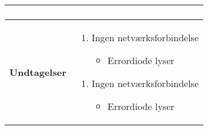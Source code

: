 \begin{center}
\begin{longtable}{|p{5cm}|p{9cm}|}
\begin{enumerate}
			\end{enumerate}
		\\\hline
		\textbf{Undtagelser}
			&\begin{enumerate}[label=\ref{kravspec:uc4_opdaterweb}.a]
			\item Ingen netværksforbindelse
					\begin{itemize}				
						\item Errordiode lyser
					\end{itemize}
			\end{enumerate}
			\begin{enumerate}[label=\ref{kravspec:uc4_emailafsend}.a]
			\item Ingen netværksforbindelse
					\begin{itemize}				
						\item Errordiode lyser
					\end{itemize}
			\end{enumerate}
		\\\hline
	\end{longtable} 
\end{center}

